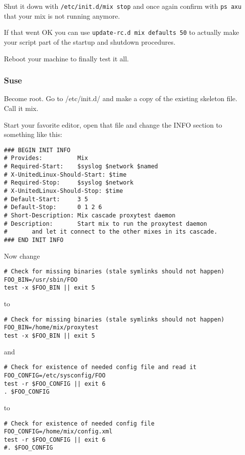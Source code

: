 \documentclass{article}
\begin{document}
Shut it down with \texttt{/etc/init.d/mix stop} and once again
confirm with \texttt{ps axu} that your mix is not running anymore.

If that went OK you can use \texttt{update-rc.d mix defaults 50} to
actually make your script part of the startup and shutdown procedures.

Reboot your machine to finally test it all.


\subsubsection {Suse}

Become root. Go to /etc/init.d/ and make a copy of the existing
skeleton file. Call it mix.

Start your favorite editor, open that file and change the INFO section to something like this:

\begin{verbatim}
### BEGIN INIT INFO
# Provides:          Mix
# Required-Start:    $syslog $network $named
# X-UnitedLinux-Should-Start: $time
# Required-Stop:     $syslog $network
# X-UnitedLinux-Should-Stop: $time
# Default-Start:     3 5
# Default-Stop:      0 1 2 6
# Short-Description: Mix cascade proxytest daemon
# Description:       Start mix to run the proxytest daemon
#       and let it connect to the other mixes in its cascade.
### END INIT INFO
\end{verbatim}

Now change 

\begin{verbatim}
# Check for missing binaries (stale symlinks should not happen)
FOO_BIN=/usr/sbin/FOO
test -x $FOO_BIN || exit 5
\end{verbatim}
to
\begin{verbatim}
# Check for missing binaries (stale symlinks should not happen)
FOO_BIN=/home/mix/proxytest
test -x $FOO_BIN || exit 5
\end{verbatim}

and 

\begin{verbatim}
# Check for existence of needed config file and read it
FOO_CONFIG=/etc/sysconfig/FOO
test -r $FOO_CONFIG || exit 6
. $FOO_CONFIG
\end{verbatim}
to
\begin{verbatim}
# Check for existence of needed config file
FOO_CONFIG=/home/mix/config.xml
test -r $FOO_CONFIG || exit 6
#. $FOO_CONFIG
\end{verbatim}
\end{document}
